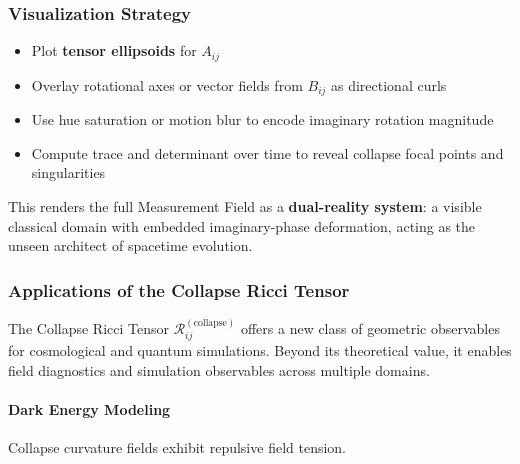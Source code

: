 \subsubsection*{Visualization Strategy}
\begin{itemize}
  \item Plot \textbf{tensor ellipsoids} for $A_{ij}$
  \item Overlay rotational axes or vector fields from $B_{ij}$ as directional curls
  \item Use hue saturation or motion blur to encode imaginary rotation magnitude
  \item Compute trace and determinant over time to reveal collapse focal points and singularities
\end{itemize}

This renders the full Measurement Field as a \textbf{dual-reality system}: a visible classical domain with embedded imaginary-phase deformation, acting as the unseen architect of spacetime evolution. \cite{imaginary_meta} 

\subsubsection*{Applications of the Collapse Ricci Tensor}

The Collapse Ricci Tensor \( \mathcal{R}^{(\text{collapse})}_{ij} \) offers a new class of geometric observables for cosmological and quantum simulations. \cite{imaginary_meta} Beyond its theoretical value, it enables field diagnostics and simulation observables across multiple domains. 

\paragraph{Dark Energy Modeling}
Collapse curvature fields exhibit repulsive field tension. \cite{imaginary_meta} 

